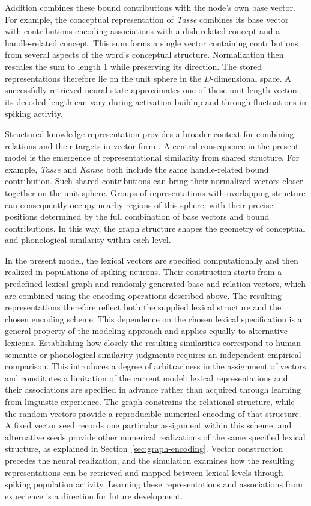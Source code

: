 Addition combines these bound contributions with the node's own base vector. For example, the conceptual representation of \emph{Tasse} combines its base vector with contributions encoding associations with a dish-related concept and a handle-related concept. This sum forms a single vector containing contributions from several aspects of the word's conceptual structure. Normalization then rescales the sum to length 1 while preserving its direction. The stored representations therefore lie on the unit sphere in the $D$-dimensional space. A successfully retrieved neural state approximates one of these unit-length vectors; its decoded length can vary during activation buildup and through fluctuations in spiking activity.

Structured knowledge representation provides a broader context for combining relations and their targets in vector form \citep{crawford2016}. A central consequence in the present model is the emergence of representational similarity from shared structure. For example, \emph{Tasse} and \emph{Kanne} both include the same handle-related bound contribution. Such shared contributions can bring their normalized vectors closer together on the unit sphere. Groups of representations with overlapping structure can consequently occupy nearby regions of this sphere, with their precise positions determined by the full combination of base vectors and bound contributions. In this way, the graph structure shapes the geometry of conceptual and phonological similarity within each level.

In the present model, the lexical vectors are specified computationally and then realized in populations of spiking neurons. Their construction starts from a predefined lexical graph and randomly generated base and relation vectors, which are combined using the encoding operations described above. The resulting representations therefore reflect both the supplied lexical structure and the chosen encoding scheme. This dependence on the chosen lexical specification is a general property of the modeling approach and applies equally to alternative lexicons. Establishing how closely the resulting similarities correspond to human semantic or phonological similarity judgments requires an independent empirical comparison. This introduces a degree of arbitrariness in the assignment of vectors and constitutes a limitation of the current model: lexical representations and their associations are specified in advance rather than acquired through learning from linguistic experience. The graph constrains the relational structure, while the random vectors provide a reproducible numerical encoding of that structure. A fixed vector seed records one particular assignment within this scheme, and alternative seeds provide other numerical realizations of the same specified lexical structure, as explained in Section~\ref{sec:graph-encoding}. Vector construction precedes the neural realization, and the simulation examines how the resulting representations can be retrieved and mapped between lexical levels through spiking population activity. Learning these representations and associations from experience is a direction for future development.
